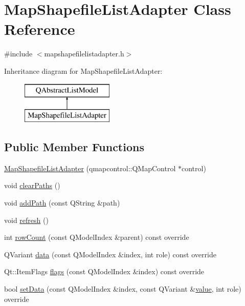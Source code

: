 \hypertarget{class_map_shapefile_list_adapter}{}\section{Map\+Shapefile\+List\+Adapter Class Reference}
\label{class_map_shapefile_list_adapter}


{\ttfamily \#include $<$mapshapefilelistadapter.\+h$>$}

Inheritance diagram for Map\+Shapefile\+List\+Adapter\+:\begin{figure}[H]
\begin{center}
\leavevmode
\includegraphics[height=2.000000cm]{dc/d8e/class_map_shapefile_list_adapter}
\end{center}
\end{figure}
\subsection*{Public Member Functions}
\begin{DoxyCompactItemize}
\item 
\mbox{\hyperlink{class_map_shapefile_list_adapter_a9c2fd579a66a62b9d24a80e6063a760d}{Map\+Shapefile\+List\+Adapter}} (qmapcontrol\+::\+Q\+Map\+Control $\ast$control)
\item 
void \mbox{\hyperlink{class_map_shapefile_list_adapter_a7ba04b59b726041543c7d0ea7f80cd12}{clear\+Paths}} ()
\item 
void \mbox{\hyperlink{class_map_shapefile_list_adapter_a155e62abacbbe12044307e44b6811b7a}{add\+Path}} (const Q\+String \&path)
\item 
void \mbox{\hyperlink{class_map_shapefile_list_adapter_a80f24074b53616d6923e19b12769bb95}{refresh}} ()
\item 
int \mbox{\hyperlink{class_map_shapefile_list_adapter_ae53d6eb19a97bb6edfb1f46ae998c5e4}{row\+Count}} (const Q\+Model\+Index \&parent) const override
\item 
Q\+Variant \mbox{\hyperlink{class_map_shapefile_list_adapter_a464a360315c2ea3a7be72fa2ddc07618}{data}} (const Q\+Model\+Index \&index, int role) const override
\item 
Qt\+::\+Item\+Flags \mbox{\hyperlink{class_map_shapefile_list_adapter_a1b435c727a1c3e9a37cdac25b2d0c71e}{flags}} (const Q\+Model\+Index \&index) const override
\item 
bool \mbox{\hyperlink{class_map_shapefile_list_adapter_a62197b2ca2e28597396bafee6c4808bd}{set\+Data}} (const Q\+Model\+Index \&index, const Q\+Variant \&\mbox{\hyperlink{diffusion_8cpp_a4b41795815d9f3d03abfc739e666d5da}{value}}, int role) override
\end{DoxyCompactItemize}


